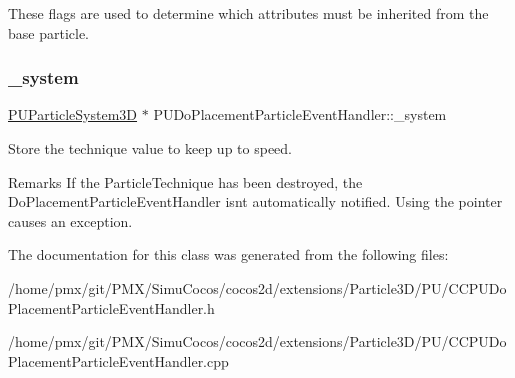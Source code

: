 These flags are used to determine which attributes must be inherited from the base particle. \mbox{\label{classPUDoPlacementParticleEventHandler_a3fbfc0691f1392108fe204e093526219}} 
\subsubsection{\texorpdfstring{\+\_\+system}{\_system}}
{\footnotesize\ttfamily \hyperlink{classPUParticleSystem3D}{P\+U\+Particle\+System3D} $\ast$ P\+U\+Do\+Placement\+Particle\+Event\+Handler\+::\+\_\+system\hspace{0.3cm}{\ttfamily [protected]}}

Store the technique value to keep up to speed. \begin{DoxyRemark}{Remarks}
If the Particle\+Technique has been destroyed, the Do\+Placement\+Particle\+Event\+Handler isn\textquotesingle{}t automatically notified. Using the pointer causes an exception. 
\end{DoxyRemark}


The documentation for this class was generated from the following files\+:\begin{DoxyCompactItemize}
\item 
/home/pmx/git/\+P\+M\+X/\+Simu\+Cocos/cocos2d/extensions/\+Particle3\+D/\+P\+U/C\+C\+P\+U\+Do\+Placement\+Particle\+Event\+Handler.\+h\item 
/home/pmx/git/\+P\+M\+X/\+Simu\+Cocos/cocos2d/extensions/\+Particle3\+D/\+P\+U/C\+C\+P\+U\+Do\+Placement\+Particle\+Event\+Handler.\+cpp\end{DoxyCompactItemize}
